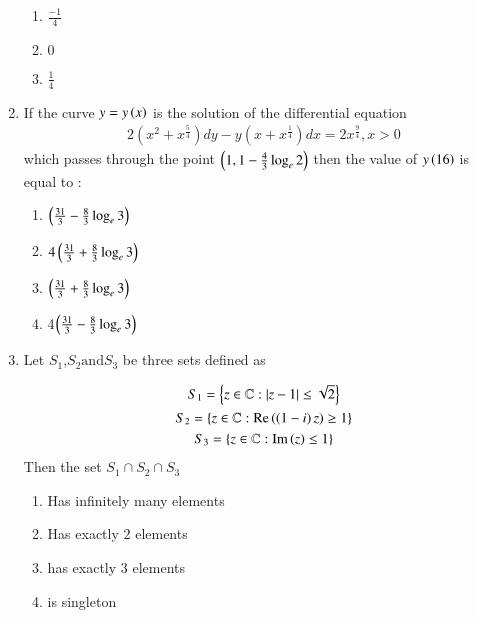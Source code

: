 \documentclass[journal,12pt,onecolumn]{IEEEtran}
\theoremstyle{remark}
\begin{document}
\begin{enumerate}
\begin{multicols}{2}
\begin{enumerate}
       \item $\frac{-1}{4}$
       \item $0$\\
       \item $\frac{1}{4}$
   \end{enumerate}
   \end{multicols}
   \item If the curve $y = y\left(x\right)$ is the solution of the differential equation 
          \begin{align}
           2(x^2 + x^{\frac{5}{4}}) dy - y(x + x^{\frac{1}{4}}) dx = 2 x^{\frac{9}{4}}, x>0
           \end{align}
           which passes through the point $\left(1 ,1 - \frac{4}{3} \log_e 2\right)$ then the value of $y\left(16\right)$ is equal to :
          \begin{multicols}{2}
              \begin{enumerate}
                  \item $\left(\frac{31}{3}- \frac{8}{3}\log_e 3\right)$\\
                   \item $4\left(\frac{31}{3}+\frac{8}{3}\log_e 3\right)$
                    \item $\left(\frac{31}{3}+ \frac{8}{3}\log_e 3\right)$\\
                     \item 4$\left(\frac{31}{3}- \frac{8}{3}\log_e 3\right)$
              \end{enumerate}
          \end{multicols}
          \item Let $S_1 \text{,} S_2 \text{and} S_3$ be three sets defined as
          
\begin{gather*}
	S_1 = \left\{z \in \mathbb C: \left\vert z-1\right\vert \leq \sqrt{2} \right\} \\
	S_2 = \left\{z \in \mathbb C: \mathrm{Re}\left(\left(1-i\right)z\right) \geq 1 \right\} \\
	S_3 = \left\{z \in \mathbb C: \mathrm{Im}\left( z\right) \leq 1\right\}
\end{gather*}
Then the set $S_1 \cap S_2 \cap S_3$

\begin{enumerate}
    \item Has infinitely many elements
    \item Has exactly $2$ elements
    \item has exactly $3$ elements 
    \item is singleton
\end{enumerate}
\end{enumerate}
\end{document}
